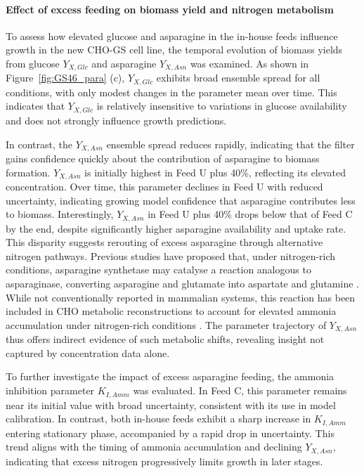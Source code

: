 \paragraph{Effect of excess feeding on biomass yield and nitrogen metabolism}

To assess how elevated glucose and asparagine in the in-house feeds influence growth in the new CHO-GS cell line, the temporal evolution of biomass yields from glucose $Y_{X,Glc}$ and asparagine $Y_{X,Asn}$ was examined. As shown in Figure~\ref{fig:GS46_para} (c), $Y_{X,Glc}$ exhibits broad ensemble spread for all conditions, with only modest changes in the parameter mean over time. This indicates that $Y_{X,Glc}$ is relatively insensitive to variations in glucose availability and does not strongly influence growth predictions.

In contrast, the $Y_{X,Asn}$ ensemble spread reduces rapidly, indicating that the filter gains confidence quickly about the contribution of asparagine to biomass formation. $Y_{X,Asn}$ is initially highest in Feed U plus 40\%, reflecting its elevated concentration. Over time, this parameter declines in Feed U with reduced uncertainty, indicating growing model confidence that asparagine contributes less to biomass. Interestingly, $Y_{X,Asn}$ in Feed U plus 40\% drops below that of Feed C by the end, despite significantly higher asparagine availability and uptake rate. This disparity suggests rerouting of excess asparagine through alternative nitrogen pathways. Previous studies have proposed that, under nitrogen-rich conditions, asparagine synthetase may catalyse a reaction analogous to asparaginase, converting asparagine and glutamate into aspartate and glutamine \cite{Quek2010MetabolicCulture}. While not conventionally reported in mammalian systems, this reaction has been included in CHO metabolic reconstructions to account for elevated ammonia accumulation under nitrogen-rich conditions \cite{Carinhas2013MetabolicTransition, Kyriakopoulos2014ACulture}. The parameter trajectory of $Y_{X,Asn}$ thus offers indirect evidence of such metabolic shifts, revealing insight not captured by concentration data alone.

To further investigate the impact of excess asparagine feeding, the ammonia inhibition parameter $K_{I,Amm}$ was evaluated. In Feed C, this parameter remains near its initial value with broad uncertainty, consistent with its use in model calibration. In contrast, both in-house feeds exhibit a sharp increase in $K_{I,Amm}$ entering stationary phase, accompanied by a rapid drop in uncertainty. This trend aligns with the timing of ammonia accumulation and declining $Y_{X,Asn}$, indicating that excess nitrogen progressively limits growth in later stages.    


